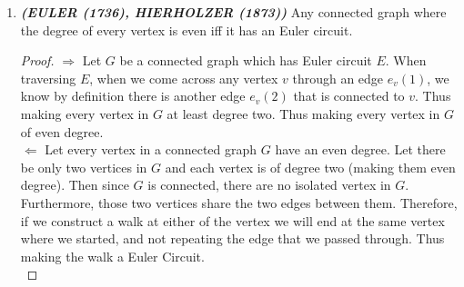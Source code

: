 \documentclass[12pt, fullpage]{article}
\begin{document}
\begin{enumerate}
	\item \textit{\textbf{(EULER (1736), HIERHOLZER (1873))}} Any connected graph where the degree of every vertex is even iff it has an Euler circuit.
\begin{proof}
 	$\Longrightarrow$ Let $G$ be a connected graph which has Euler circuit $E$. When traversing $E$, when we come across any vertex $v$ through an edge $e_v(1)$, we know by definition there is another edge $e_v(2)$ that is connected to $v$. Thus making every vertex in $G$ at least degree two. Thus making every vertex in $G$ of even degree. \\
 	
 	$\Longleftarrow$ Let every vertex in a connected graph $G$ have an even degree. Let there be only two vertices in $G$ and each vertex is of degree two (making them even degree). Then since $G$ is connected, there are no isolated vertex in $G$. Furthermore, those two vertices share the two edges between them. Therefore, if we construct a walk at either of the vertex we will end at the same vertex where we started, and not repeating the edge that we passed through. Thus making the walk a Euler Circuit.\\
 	

\end{proof}
\end{enumerate}
\end{document}
